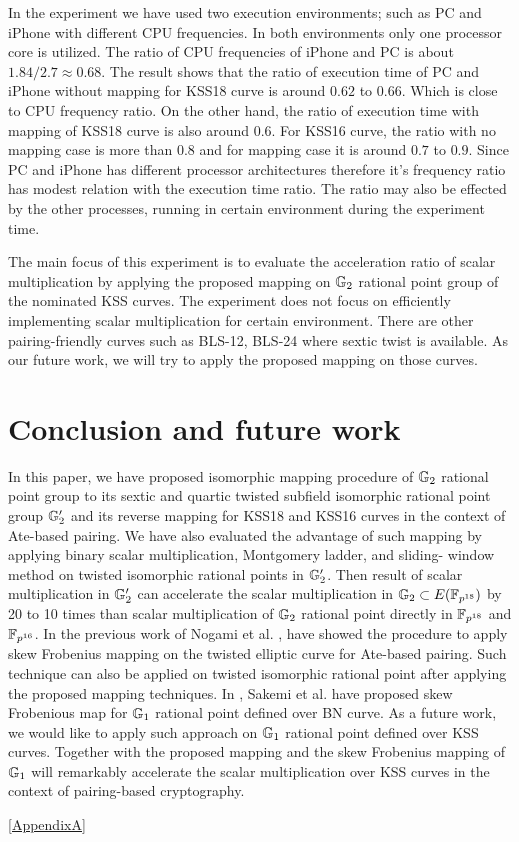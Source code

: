 In the experiment we have used two execution environments; such as PC and iPhone with different CPU frequencies. 
In both environments only one processor core is utilized.
 The ratio of CPU frequencies of  iPhone and PC is about $1.84 / 2.7 \approx 0.68$. 
The result  shows that the ratio of execution time of PC and iPhone without mapping  for KSS18 curve is around $0.62$ to $0.66$.
Which is close to CPU frequency ratio.
On the other hand, the ratio of execution time with mapping  of KSS18 curve is also around $0.6$. 
For KSS16 curve, the ratio with no mapping case is more than $0.8$ and for mapping case it is around $0.7$ to $0.9$.   
Since PC and iPhone has different processor architectures therefore it's frequency ratio has modest relation with the execution time ratio. 
The ratio may also be effected by the other processes, running in certain environment during the experiment time.

The main focus of this experiment is to evaluate the  acceleration ratio of scalar multiplication by applying the proposed mapping on ${\mathbb{G}}_{2}$ rational point group of the nominated KSS curves. The experiment does not focus on efficiently implementing scalar multiplication for certain environment. There are other pairing-friendly curves such as BLS-12, BLS-24 \cite{taxonomy} where sextic twist is available. As our future work, we will try to apply the proposed mapping on those curves.

\section{Conclusion and future work}
In this paper, we have proposed isomorphic mapping procedure of ${\mathbb{G}}_{2}$ rational point group to its sextic and quartic twisted subfield isomorphic rational point group ${\mathbb{G}}_{2}'$  and its reverse mapping for KSS18 and KSS16 curves in the context of Ate-based pairing. 
We have also evaluated the advantage of such mapping by applying binary scalar multiplication, Montgomery ladder, and sliding- window method on twisted isomorphic rational points in ${\mathbb{G}}_{2}'$. 
Then result of  scalar multiplication in ${\mathbb{G}}_{2}'$ can accelerate the scalar multiplication in ${\mathbb{G}}_{2} \subset E(\mathbb{F}_{p^{18}})$ by   20 to 10 times than scalar multiplication of ${\mathbb{G}}_{2}$ rational point directly in $\mathbb{F}_{p^{18}}$ and $\mathbb{F}_{p^{16}}$. 
In the previous work of Nogami et al. \cite{nogami}, have showed the procedure to apply skew Frobenius mapping on the twisted elliptic curve for Ate-based pairing. Such technique can also be applied on twisted isomorphic rational point after applying the proposed mapping techniques.
In \cite{sakemi_skew},  Sakemi et al.  have proposed skew Frobenious map for ${\mathbb{G}}_{1}$ rational point defined over BN curve.
As a future work, we would like to apply such approach on ${\mathbb{G}}_{1}$ rational point defined over KSS curves. Together with the proposed mapping and the skew Frobenius mapping of ${\mathbb{G}}_{1}$ will remarkably accelerate the scalar multiplication over KSS curves in the context of pairing-based cryptography.  

\ref{AppendixA}